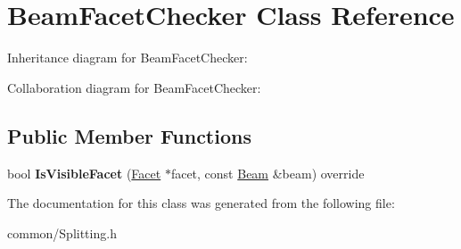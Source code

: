 \hypertarget{class_beam_facet_checker}{}\section{Beam\+Facet\+Checker Class Reference}
\label{class_beam_facet_checker}


Inheritance diagram for Beam\+Facet\+Checker\+:


Collaboration diagram for Beam\+Facet\+Checker\+:
\subsection*{Public Member Functions}
\begin{DoxyCompactItemize}
\item 
\mbox{\label{class_beam_facet_checker_af5ae305a6ed89255a20717ed82e80e21}} 
bool {\bfseries Is\+Visible\+Facet} (\mbox{\hyperlink{class_facet}{Facet}} $\ast$facet, const \mbox{\hyperlink{class_beam}{Beam}} \&beam) override
\end{DoxyCompactItemize}


The documentation for this class was generated from the following file\+:\begin{DoxyCompactItemize}
\item 
common/Splitting.\+h\end{DoxyCompactItemize}
